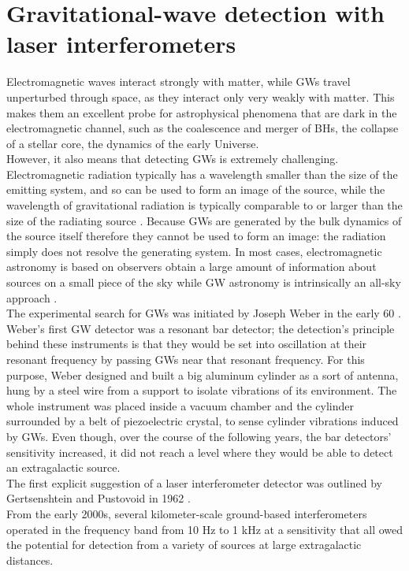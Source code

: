 \documentclass[binding=0.6cm, LaM]{sapthesis}
\begin{document}
\section{Gravitational-wave detection with laser interferometers}

	Electromagnetic waves interact strongly with matter, while GWs travel unperturbed through space,
        as they interact only very weakly with matter. This makes them an excellent probe for astrophysical phenomena that are dark
        in the electromagnetic channel, such as the coalescence and merger of BHs, the collapse of a stellar core,
  	the dynamics of the early Universe. \\
	However, it also means that detecting GWs is extremely challenging.
        Electromagnetic radiation typically has a wavelength smaller than the size of the emitting system,
        and so can be used to form an image of the source, while the wavelength of gravitational radiation is typically comparable
        to or larger than the size of the radiating source \cite{18}. 
        Because GWs are generated by the bulk dynamics of the source itself therefore they cannot be used to form an image:
        the radiation simply does not resolve the generating system.
        In most cases, electromagnetic astronomy is based on observers obtain a large amount of information about sources on a small piece
        of the sky while GW astronomy is intrinsically an all-sky approach \cite{4}. \\
	The experimental search for GWs was initiated by Joseph Weber in the early 60  \cite{7}.
	Weber’s first GW detector was a resonant bar detector; 
	the detection’s principle behind these instruments is that 
	they would be set into oscillation at their resonant frequency 
	by passing GWs near that resonant frequency.
	For this purpose, Weber designed and built a big aluminum cylinder as a sort of antenna, 
	hung by a steel wire from a support to isolate vibrations of its environment. 
	The whole instrument was placed inside a vacuum chamber 
	and the cylinder surrounded by a belt of piezoelectric crystal, 
	to sense cylinder vibrations induced by GWs.
	Even though, over the course of the following years, the bar detectors’ sensitivity increased, 
	it did not reach a level where they would be able to detect an extragalactic source. \\
	The first explicit suggestion of a laser interferometer detector 
	was outlined by Gertsenshtein and Pustovoid in 1962 \cite{8}. \\
	From the early 2000s, several kilometer-scale ground-based interferometers 
	operated in the frequency band from 10 Hz to 1 kHz at a sensitivity 
	that all owed the potential for detection from a variety 
	of sources at large extragalactic distances.
\end{document}
